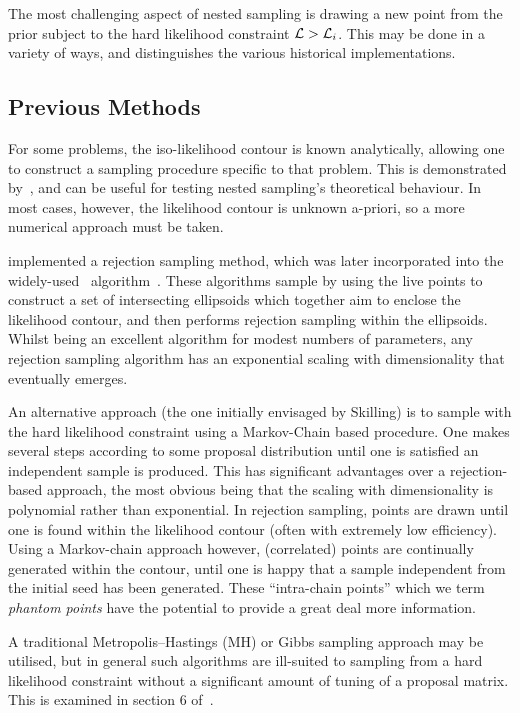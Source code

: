 The most challenging aspect of nested sampling is drawing a new point from the prior subject to the hard likelihood constraint $\mathcal{L}>\mathcal{L}_i$. This may be done in a variety of ways, and distinguishes the various historical implementations.

\subsection{Previous Methods}
\label{sec:pc:previous_methods}
For some problems, the iso-likelihood contour is known analytically, allowing one to construct a sampling procedure specific to that problem. This is demonstrated by~\cite{Keeton}, and can be useful for testing nested sampling's theoretical behaviour. In most cases, however, the likelihood contour is unknown a-priori, so a more numerical approach must be taken.

\cite{Mukherjee} implemented a rejection sampling method, which was later incorporated into the widely-used~\MultiNest{} algorithm~\citep{MultiNest1,MultiNest2,MultiNest3}.
These algorithms sample by using the live points to construct a set of intersecting ellipsoids which together aim to enclose the likelihood contour, and then performs rejection sampling within the ellipsoids.
 Whilst being an excellent algorithm for modest numbers of parameters, any rejection sampling algorithm has an exponential scaling with dimensionality that eventually emerges.

An alternative approach (the one initially envisaged by Skilling) is to sample with the hard likelihood constraint using a Markov-Chain based procedure. One makes several steps according to some proposal distribution until one is satisfied an independent sample is produced. This has significant advantages over a rejection-based approach, the most obvious being that the scaling with dimensionality is polynomial rather than exponential. In rejection sampling, points are drawn until one is found within the likelihood contour (often with extremely low efficiency). Using a Markov-chain approach however, (correlated) points are continually generated within the contour, until one is happy that a sample independent from the initial seed has been generated. These ``intra-chain points'' which we term {\em phantom points\/} have the potential to provide a great deal more information.

A traditional Metropolis--Hastings (MH) or Gibbs sampling approach may be utilised, but in general such algorithms are ill-suited to sampling from a hard likelihood constraint without a significant amount of tuning of a proposal matrix. This is examined in section 6 of~\cite{MultiNest1}.

